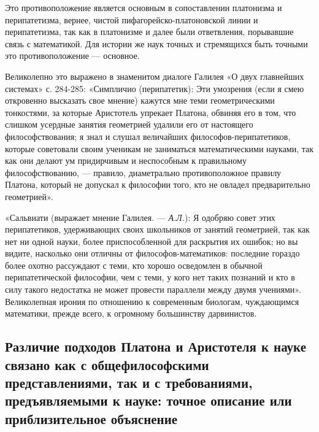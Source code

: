 Это противоположение является основным в сопоставлении платонизма и
перипатетизма, вернее, чистой пифагорейско-платоновской линии и
перипатетизма, так как в платонизме и далее были ответвления,
порывавшие связь с математикой. Для истории же наук точных и
стремящихся быть точными это противоположение --- основное.

Великолепно это выражено в знаменитом диалоге Галилея «О двух
главнейших системах» с. 284-285: «Симпличио (перипатетик): Эти
умозрения (если я смею откровенно высказать свое мнение) кажутся мне
теми геометрическими тонкостями, за которые Аристотель упрекает
Платона, обвиняя его в том, что слишком усердные занятия геометрией
удалили его от настоящего философствования; я знал и слушал величайших
философов-перипатетиков, которые советовали своим ученикам не
заниматься математическими науками, так как они делают ум придирчивым
и неспособным к правильному философствованию, --- правило,
диаметрально противоположное правилу Платона, который не допускал к
философии того, кто не овладел предварительно геометрией».

«Сальвиати (выражает мнение Галилея. --- \emph{А.Л.}): Я одобряю совет
этих перипатетиков, удерживающих своих школьников от занятий
геометрией, так как нет ни одной науки, более приспособленной для
раскрытия их ошибок; но вы видите, насколько они отличны от
философов-математиков: последние гораздо более охотно рассуждают с
теми, кто хорошо осведомлен в обычной перипатетической философии, чем
с теми, у кого нет таких познаний и кто в силу такого недостатка не
может провести параллели между двумя учениями». Великолепная ирония по
отношению к современным биологам, чуждающимся математики, прежде
всего, к огромному большинству дарвинистов.

\subsection{Различие подходов Платона и Аристотеля к науке связано как
с общефилософскими представлениями, так и с требованиями,
предъявляемыми к науке: точное описание или приблизительное
объяснение}

